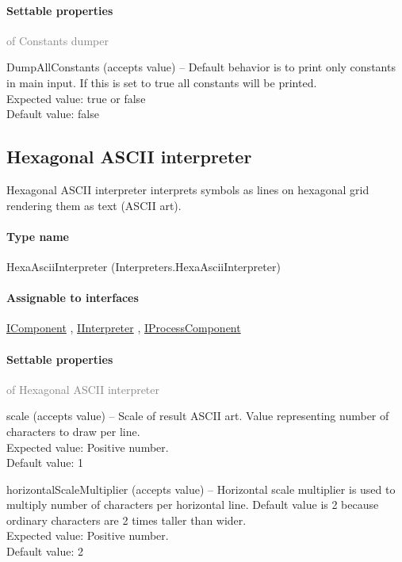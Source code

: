 	\paragraph{Settable properties}\textcolor{gray}{of Constants dumper}
	\begin{description*}
		\item[DumpAllConstants]
		(accepts value)
			-- Default behavior is to print only constants in main input.
            If this is set to true all constants will be printed.
			\\ Expected value: true or false
			\\ Default value: false
	\end{description*}
	


\subsection{Hexagonal ASCII interpreter}
\label{Malsys.Processing.Components.Interpreters.HexaAsciiInterpreter}
Hexagonal ASCII interpreter interprets symbols as lines on hexagonal grid rendering them as text (ASCII art).\paragraph{Type name}
HexaAsciiInterpreter (Interpreters.HexaAsciiInterpreter) 	\paragraph{Assignable to interfaces}
		\hyperref[Malsys.Processing.Components.IComponent]{IComponent}%
, 		\hyperref[Malsys.Processing.Components.IInterpreter]{IInterpreter}%
, 		\hyperref[Malsys.Processing.Components.IProcessComponent]{IProcessComponent}%
	\paragraph{Settable properties}\textcolor{gray}{of Hexagonal ASCII interpreter}
	\begin{description*}
		\item[scale]
		(accepts value)
			-- Scale of result ASCII art.
            Value representing number of characters to draw per line.
			\\ Expected value: Positive number.
			\\ Default value: 1
		\item[horizontalScaleMultiplier]
		(accepts value)
			-- Horizontal scale multiplier is used to multiply number of characters per horizontal line.
            Default value is 2 because ordinary characters are 2 times taller than wider.
			\\ Expected value: Positive number.
			\\ Default value: 2
	\end{description*}
